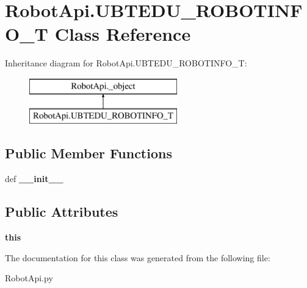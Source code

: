 \hypertarget{classRobotApi_1_1UBTEDU__ROBOTINFO__T}{\section{Robot\+Api.\+U\+B\+T\+E\+D\+U\+\_\+\+R\+O\+B\+O\+T\+I\+N\+F\+O\+\_\+\+T Class Reference}
\label{classRobotApi_1_1UBTEDU__ROBOTINFO__T}
}
Inheritance diagram for Robot\+Api.\+U\+B\+T\+E\+D\+U\+\_\+\+R\+O\+B\+O\+T\+I\+N\+F\+O\+\_\+\+T\+:\begin{figure}[H]
\begin{center}
\leavevmode
\includegraphics[height=2.000000cm]{classRobotApi_1_1UBTEDU__ROBOTINFO__T}
\end{center}
\end{figure}
\subsection*{Public Member Functions}
\begin{DoxyCompactItemize}
\item 
\hypertarget{classRobotApi_1_1UBTEDU__ROBOTINFO__T_a4a1c2f5b9e2914a135f345e11389b38a}{def {\bfseries \+\_\+\+\_\+init\+\_\+\+\_\+}}\label{classRobotApi_1_1UBTEDU__ROBOTINFO__T_a4a1c2f5b9e2914a135f345e11389b38a}

\end{DoxyCompactItemize}
\subsection*{Public Attributes}
\begin{DoxyCompactItemize}
\item 
\hypertarget{classRobotApi_1_1UBTEDU__ROBOTINFO__T_ab9befe76e1e0980a75d9555bd7b594da}{{\bfseries this}}\label{classRobotApi_1_1UBTEDU__ROBOTINFO__T_ab9befe76e1e0980a75d9555bd7b594da}

\end{DoxyCompactItemize}


The documentation for this class was generated from the following file\+:\begin{DoxyCompactItemize}
\item 
Robot\+Api.\+py\end{DoxyCompactItemize}
